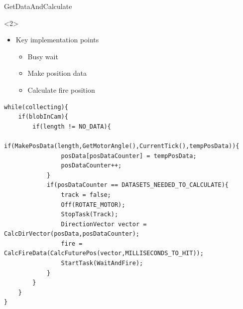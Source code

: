 \begin{frame}[fragile]{GetDataAndCalculate}
\begin{onlyenv}<2>
\begin{itemize}
	\item Key implementation points
		\begin{itemize}
  			\item Busy wait 
  			\item Make position data
  			\item Calculate fire position 
		\end{itemize}
\end{itemize}
\begin{center}
\begin{minipage}[H]{0.9\linewidth}
\begin{lstlisting}
while(collecting){
	if(blobInCam){
        if(length != NO_DATA){
            if(MakePosData(length,GetMotorAngle(),CurrentTick(),tempPosData)){
            	posData[posDataCounter] = tempPosData;
                posDataCounter++;
            }
            if(posDataCounter == DATASETS_NEEDED_TO_CALCULATE){
				track = false;
                Off(ROTATE_MOTOR); 
                StopTask(Track);
                DirectionVector vector = CalcDirVector(posData,posDataCounter);
                fire = CalcFireData(CalcFuturePos(vector,MILLISECONDS_TO_HIT));
                StartTask(WaitAndFire);
            }
    	}
	}
}
\end{lstlisting} 
\end{minipage}
\end{center}
\end{onlyenv}
\end{frame}


